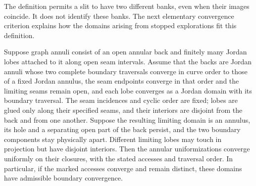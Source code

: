 The definition permits a slit to have two different banks, even when
their images coincide.  It does not identify these banks.  The next
elementary convergence criterion explains how the domains arising from
stopped explorations fit this definition.

\begin{lemma}
\label{an:back-lobes}
Suppose graph annuli consist of an open annular back and finitely many
Jordan lobes attached to it along open seam intervals.  Assume that the
backs are Jordan annuli whose two complete boundary traversals converge
in curve order to those of a fixed Jordan annulus, the seam endpoints
converge in that order and the limiting seams remain open, and each lobe
converges as a Jordan domain with its boundary traversal.  The seam
incidences and cyclic order are fixed; lobes are glued only along their
specified seams, and their interiors are disjoint from the back and from
one another.  Suppose the resulting
limiting domain is an annulus, its hole and a separating open part of the
back persist, and the two boundary components stay physically apart.
Different limiting lobes may touch in projection but have disjoint
interiors.  Then the annular uniformizations converge uniformly on their
closures, with the stated accesses and traversal order.  In particular,
if the marked accesses converge and remain distinct, these domains have
admissible boundary convergence.
\end{lemma}

